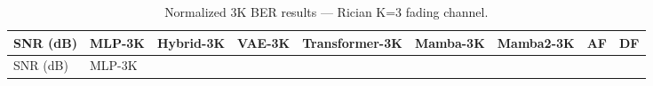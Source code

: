 \begin{longtable}[]{@{}
  >{\raggedright\arraybackslash}p{}
  >{\raggedright\arraybackslash}p{}
  >{\raggedright\arraybackslash}p{}
  >{\raggedright\arraybackslash}p{}
  >{\raggedright\arraybackslash}p{}
  >{\raggedright\arraybackslash}p{}
  >{\raggedright\arraybackslash}p{}
  >{\raggedright\arraybackslash}p{}
  >{\raggedright\arraybackslash}p{}@{}}
\caption{Normalized 3K BER results --- Rician K=3 fading channel.}\label{tbl:table9}\tabularnewline
\toprule\noalign{}
\begin{minipage}[b]{\linewidth}\raggedright
SNR (dB)
\end{minipage} & \begin{minipage}[b]{\linewidth}\raggedright
MLP-3K
\end{minipage} & \begin{minipage}[b]{\linewidth}\raggedright
Hybrid-3K
\end{minipage} & \begin{minipage}[b]{\linewidth}\raggedright
VAE-3K
\end{minipage} & \begin{minipage}[b]{\linewidth}\raggedright
Transformer-3K
\end{minipage} & \begin{minipage}[b]{\linewidth}\raggedright
Mamba-3K
\end{minipage} & \begin{minipage}[b]{\linewidth}\raggedright
Mamba2-3K
\end{minipage} & \begin{minipage}[b]{\linewidth}\raggedright
AF
\end{minipage} & \begin{minipage}[b]{\linewidth}\raggedright
DF
\end{minipage} \\
\midrule\noalign{}
\endfirsthead
\toprule\noalign{}
\begin{minipage}[b]{\linewidth}\raggedright
SNR (dB)
\end{minipage} & \begin{minipage}[b]{\linewidth}\raggedright
MLP-3K
\end{minipage} & \begin{minipage}[b]{\linewidth}\raggedright

\end{minipage}
\end{longtable}
